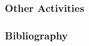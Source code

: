 \documentclass{beamer}
\begin{document}
\begin{frame}
\frametitle{Other Activities}


\end{frame}


\begin{frame}[allowframebreaks]
\frametitle{Bibliography}



\end{frame}

\end{document}
